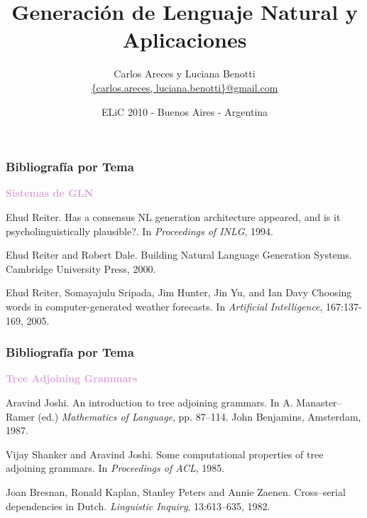 \documentclass[compress,color=usenames]{beamer}
\title[GLN y Aplicaciones]{\Huge Generaci\'on de Lenguaje Natural y Aplicaciones}
\author[Areces \& Benotti]{
 Carlos Areces y Luciana Benotti\\[1ex]
\normalsize \url{{carlos.areces, luciana.benotti}@gmail.com}}
\institute[INRIA / UNC]{
INRIA Nancy Grand Est, Nancy, France\\
Universidad Nacional de C\'ordoba, C\'ordoba, Argentina}
\date{ELiC 2010 - Buenos Aires - Argentina}
\newcommand{\mH}[1]{\textcolor{Plum}{#1}}
\begin{document}
\begin{frame}
\frametitle{Bibliograf\'ia por Tema}

\mH{\bf Sistemas de GLN}
\medskip

\begin{thebibliography}{10}\small


 Ehud Reiter.
\newblock Has a
  consensus NL generation architecture appeared, and is it
  psycholinguistically plausible?.
\newblock In \emph{Proceedings of INLG}, 1994.

 Ehud Reiter and Robert Dale.
\newblock Building Natural Language Generation Systems.
\newblock Cambridge University Press, 2000.

 Ehud Reiter, Somayajulu Sripada, Jim Hunter, Jin Yu, and Ian Davy
\newblock Choosing words in computer-generated weather forecasts.
\newblock In \emph{Artificial Intelligence}, 167:137-169, 2005.

\end{thebibliography}
\end{frame}


\begin{frame}
\frametitle{Bibliograf\'ia por Tema}

\mH{\bf Tree Adjoining Grammars}
\medskip

\begin{thebibliography}{10}\small

 Aravind Joshi.
\newblock An introduction to tree adjoining
grammars.
\newblock In A. Manaster--Ramer (ed.) \emph{Mathematics of Language}, pp. 87--114. John Benjamins, 
Amsterdam, 1987.

 Vijay Shanker and Aravind Joshi.
\newblock Some computational properties of tree adjoining grammars.
\newblock In \emph{Proceedings of ACL}, 1985.

 Joan  Bresnan, Ronald  Kaplan, Stanley Peters and
Annie Zaenen.
\newblock Cross--serial dependencies in Dutch.
\newblock \emph{Linguistic Inquiry}, 13:613--635, 1982.

\end{thebibliography}
\end{frame}
\end{document}
